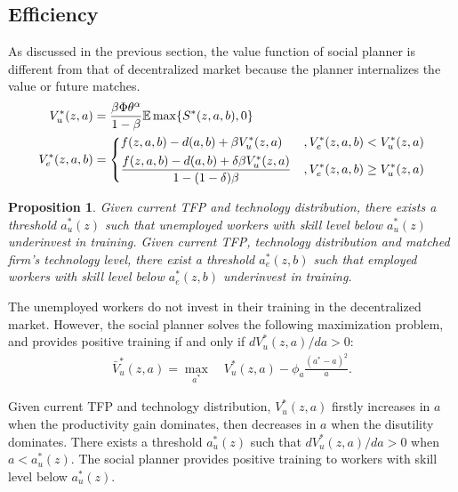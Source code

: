 \documentclass[12pt]{article}
\newtheorem{proposition}{Proposition}
\newcommand{\E}{\mathbb{E}}
\newcommand{\1}{\mathbb{1}}
\begin{document}
\subsection{Efficiency}
As discussed in the previous section, the value function of social planner is different from that of decentralized market because the planner internalizes the value or future matches. 
\begin{align*}
V_u^*(z,a) &= \frac{\beta\Phi\theta^{\alpha}}{1-\beta}\E \max\{S^*(z,a,b),0\} \\
V_e^*(z,a,b) &= 
\begin{dcases}
f(z,a,b)-d(a,b)+\beta V_u^*(z,a)&, V_e^*(z,a,b)<V_u^*(z,a)\\
\frac{f(z,a,b)-d(a,b)+\delta\beta V_u^*(z,a)}{1-(1-\delta)\beta} &,  V_e^*(z,a,b) \geq V_u^*(z,a) \\
\end{dcases}
\end{align*}

\begin{proposition}
Given current TFP and technology distribution, there exists a threshold $a_u^{*}(z)$ such that unemployed workers with skill level below $a_u^{*}(z)$ underinvest in training. Given current TFP, technology distribution and matched firm's technology level, there exist a threshold $a_e^{*}(z,b)$ such that employed workers with skill level below $a_e^{*}(z,b)$ underinvest in training.
\end{proposition}

The unemployed workers do not invest in their training in the decentralized market. However, the social planner solves the following maximization problem, and provides positive training if and only if $d V_u^*(z,a)/d a>0$:
\begin{align*}
\bar{V}_u^*(z,a) = \max_{a^*} \quad V_u^*(z,a)-\phi_a\frac{(a^*-a)^2}{a}.
\end{align*}

Given current TFP and technology distribution, $V_u^*(z,a)$ firstly increases in $a$ when the productivity gain dominates, then decreases in $a$ when the disutility dominates. There exists a threshold $a_u^{*}(z)$ such that $d V_u^*(z,a)/d a>0$ when $a<a_u^{*}(z)$. The social planner provides positive training to workers with skill level below $a_u^{*}(z)$. 
\end{document}
